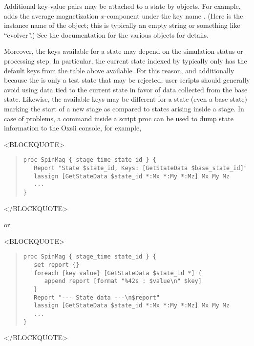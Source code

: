 \begin{description}
Additional key-value pairs may be attached to a state by 
objects.  For example,
adds the average magnetization $x$-component under the key name
.
(Here  is the instance name of the
object; this is typically an empty string or something like
``evolver''.)  See the documentation for the various 
objects for details.

Moreover, the keys available for a state may depend on the simulation
status or processing step.  In particular, the current state indexed
by  typically only has the default keys from the
table above available.  For this reason, and additionally because
the  is only a test state that may be rejected,
user scripts should generally avoid using data tied to the current state
in favor of data collected from the base state.  Likewise, the available
keys may be different for a state (even a base state) marking the start
of a new stage as compared to states arising inside a stage.  In case of
problems, a  command inside a script proc can be used to
dump state information to the Oxsii console, for example,
\begin{rawhtml}
<BLOCKQUOTE>
\end{rawhtml}
\begin{quote}
\begin{verbatim}
proc SpinMag { stage_time state_id } {
   Report "State $state_id, Keys: [GetStateData $base_state_id]"
   lassign [GetStateData $state_id *:Mx *:My *:Mz] Mx My Mz
   ...
}
\end{verbatim}
\end{quote}
\begin{rawhtml}
</BLOCKQUOTE>
\end{rawhtml}
or
\begin{rawhtml}
<BLOCKQUOTE>
\end{rawhtml}
\begin{quote}
\begin{verbatim}
proc SpinMag { stage_time state_id } {
   set report {}
   foreach {key value} [GetStateData $state_id *] {
      append report [format "%42s : $value\n" $key]
   }
   Report "--- State data ---\n$report"
   lassign [GetStateData $state_id *:Mx *:My *:Mz] Mx My Mz
   ...
}
\end{verbatim}
\end{quote}
\begin{rawhtml}
</BLOCKQUOTE>
\end{rawhtml}


\end{description}
